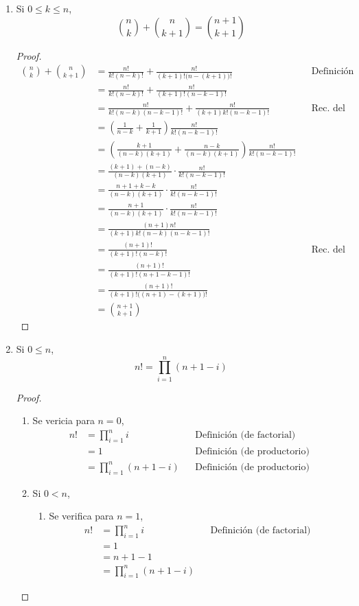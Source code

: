 \begin{enumerate}[label=\alph*)]
  \item Si $0\leq k \leq n$, \[\binom{n}{k} + \binom{n}{k+1} = \binom{n+1}{k+1}\]
  \begin{proof}\leavevmode
    \begin{align*}
      \binom{n}{k} + \binom{n}{k+1} &= \frac{n!}{k!(n-k)!} + \frac{n!}{(k+1)!\big(n-(k+1)\big)!} && \text{Definición}\\
      &= \frac{n!}{k!(n-k)!} + \frac{n!}{(k+1)!(n-k-1)!} \\ 
      &= \frac{n!}{k!(n-k)(n-k-1)!} + \frac{n!}{(k+1)k!(n-k-1)!}&& \text{Rec. del factorial} \\
      &= \left(\frac{1}{n-k} + \frac{1}{k+1}\right) \frac{n!}{k!(n-k-1)!}\\
      &= \left(\frac{k+1}{(n-k)(k+1)} + \frac{n-k}{(n-k)(k+1)}\right) \frac{n!}{k!(n-k-1)!} \\
      &= \frac{(k+1)+(n-k)}{(n-k)(k+1)} \cdot \frac{n!}{k!(n-k-1)!}\\
      &= \frac{n+1+k-k}{(n-k)(k+1)} \cdot \frac{n!}{k!(n-k-1)!} \\ 
      &= \frac{n+1}{(n-k)(k+1)} \cdot \frac{n!}{k!(n-k-1)!} \\ 
      &= \frac{(n+1)n!}{(k+1)k!(n-k)(n-k-1)!}\\
      &= \frac{(n+1)!}{(k+1)!(n-k)!} && \text{Rec. del factorial}\\
      &= \frac{(n+1)!}{(k+1)!(n+1-k-1)!}\\
      &= \frac{(n+1)!}{(k+1)!\big((n+1)-(k+1)\big)!}\\
      &= \binom{n+1}{k+1}
    \end{align*}
  \end{proof}
  
  \item Si $0\leq n$, \[n! = \prod_{i=1}^n (n+1-i)\]
  
  \begin{proof}\leavevmode
    \begin{enumerate}[label=\Roman*)]
      \item Se vericia para $n=0$,
      \begin{align*}
        n! &= \prod_{i=1}^n i && \text{Definición (de factorial)}\\
        &= 1 && \text{Definición (de productorio)}\\
        &= \prod_{i=1}^n (n+1-i) && \text{Definición (de productorio)}
      \end{align*}
      
      \item Si $0<n$,
      \begin{enumerate}[label=\roman*)]
        \item Se verifica para $n=1$,
        \begin{align*}
          n! &= \prod_{i=1}^n i && \text{Definición (de factorial)}\\
          &= 1 \\
          &= n + 1 - 1 \\
          &= \prod_{i=1}^n (n+1-i)
        \end{align*}
        

\end{enumerate}
\end{enumerate}
\end{proof}
\end{enumerate}
